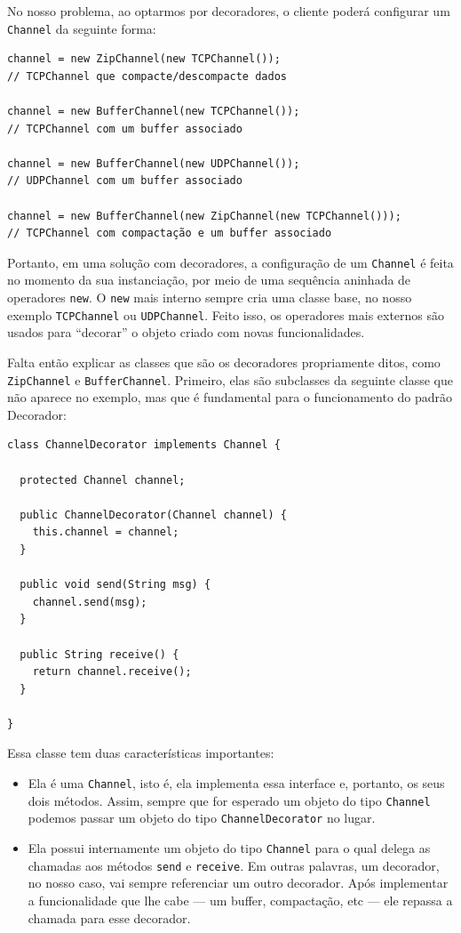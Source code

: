 \documentclass[
  11pt,
  twoside]{book}
\newcommand{\passthrough}[1]{#1}
\begin{document}
No nosso problema, ao optarmos por decoradores, o cliente poderá
configurar um \passthrough{\lstinline!Channel!} da seguinte forma:

\begin{lstlisting}
channel = new ZipChannel(new TCPChannel());
// TCPChannel que compacte/descompacte dados 

channel = new BufferChannel(new TCPChannel());
// TCPChannel com um buffer associado

channel = new BufferChannel(new UDPChannel());
// UDPChannel com um buffer associado

channel = new BufferChannel(new ZipChannel(new TCPChannel()));
// TCPChannel com compactação e um buffer associado
\end{lstlisting}

Portanto, em uma solução com decoradores, a configuração de um
\passthrough{\lstinline!Channel!} é feita no momento da sua
instanciação, por meio de uma sequência aninhada de operadores
\passthrough{\lstinline!new!}. O \passthrough{\lstinline!new!} mais
interno sempre cria uma classe base, no nosso exemplo
\passthrough{\lstinline!TCPChannel!} ou
\passthrough{\lstinline!UDPChannel!}. Feito isso, os operadores mais
externos são usados para ``decorar'' o objeto criado com novas
funcionalidades.

Falta então explicar as classes que são os decoradores propriamente
ditos, como \passthrough{\lstinline!ZipChannel!} e
\passthrough{\lstinline!BufferChannel!}. Primeiro, elas são subclasses
da seguinte classe que não aparece no exemplo, mas que é fundamental
para o funcionamento do padrão Decorador:

\begin{lstlisting}
class ChannelDecorator implements Channel {

  protected Channel channel;

  public ChannelDecorator(Channel channel) {
    this.channel = channel;
  }

  public void send(String msg) {
    channel.send(msg);
  }

  public String receive() {
    return channel.receive();
  }

}
\end{lstlisting}

Essa classe tem duas características importantes:

\begin{itemize}
\item
  Ela é uma \passthrough{\lstinline!Channel!}, isto é, ela implementa
  essa interface e, portanto, os seus dois métodos. Assim, sempre que
  for esperado um objeto do tipo \passthrough{\lstinline!Channel!}
  podemos passar um objeto do tipo
  \passthrough{\lstinline!ChannelDecorator!} no lugar.
\item
  Ela possui internamente um objeto do tipo
  \passthrough{\lstinline!Channel!} para o qual delega as chamadas aos
  métodos \passthrough{\lstinline!send!} e
  \passthrough{\lstinline!receive!}. Em outras palavras, um decorador,
  no nosso caso, vai sempre referenciar um outro decorador. Após
  implementar a funcionalidade que lhe cabe --- um buffer, compactação,
  etc --- ele repassa a chamada para esse decorador.
\end{itemize}
\end{document}

